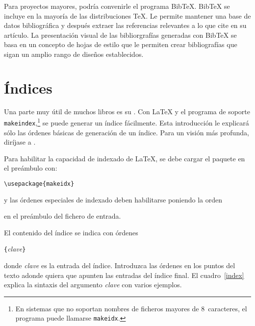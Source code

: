 \thispagestyle{fancyplain}

Para proyectos mayores, podría convenirle el programa Bib\TeX{}.
Bib\TeX{} se incluye en la mayoría de las distribuciones \TeX{}.  Le
permite mantener una base de datos bibliográfica y después extraer las
referencias relevantes a lo que cite en su artículo.  La presentación
visual de las bibliorgrafías generadas con Bib\TeX{} se basa en un
concepto de hojas de estilo que le permiten crear bibliografías que
sigan un amplio rango de diseños establecidos.

\newpage

\section{Índices} \label{sec:indexing}
Una parte muy útil de muchos libros es su . Con \LaTeX{} y
el programa de soporte \texttt{makeindex},\footnote{En sistemas que no
soportan nombres de ficheros mayores de 8~caracteres, el programa
puede llamarse \texttt{makeidx}.} se puede generar un índice
fácilmente.  Esta introducción le explicará sólo las órdenes básicas
de generación de un índice.  Para un visión más profunda, diríjase a 
\companion.   

Para habilitar la capacidad de indexado de \LaTeX{}, se debe cargar
el paquete  en el preámbulo con:
\begin{lscommand}
\verb|\usepackage{makeidx}|
\end{lscommand}
\noindent y las órdenes especiales de indexado deben habilitarse
poniendo la orden
\begin{lscommand}
\end{lscommand}
\noindent en el preámbulo del fichero de entrada.

El contenido del índice se indica con órdenes
\begin{lscommand}
  \verb|{|\emph{clave}\verb|}|
\end{lscommand}
\noindent donde \emph{clave} es la entrada del índice.  Introduzca las
órdenes en los puntos del texto adonde quiera que apunten las entradas
del índice final.  El cuadro~\ref{index} explica la sintaxis del argumento
\emph{clave} con varios ejemplos.

